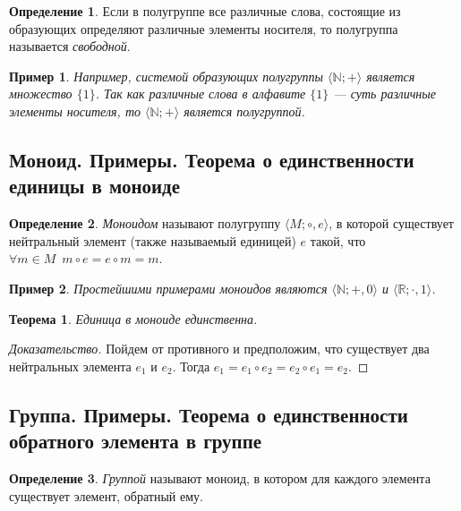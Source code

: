 \documentclass{article}
\newtheorem*{theorem*}{Теорема}
\theoremstyle{plain}
\newtheorem*{example*}{Пример}
\theoremstyle{definition}
\newtheorem{definition}{Определение}[subsection]
\begin{document}
\begin{definition}
	Если в полугруппе все различные слова, состоящие из образующих определяют различные элементы носителя, то полугруппа называется \textit{свободной}.
\end{definition}

\begin{example*}
	Например, системой образующих полугруппы \(\langle \mathbb{N}; + \rangle\) является множество \(\{1\}\). Так как различные слова в алфавите \(\{1\}\) — суть различные элементы носителя, то \(\langle \mathbb{N}; + \rangle\) является полугруппой.
\end{example*}

\subsection{Моноид. Примеры. Теорема о единственности единицы в моноиде}

\begin{definition}
	\textit{Моноидом} называют полугруппу \(\langle M; \circ, e\rangle\), в которой существует нейтральный элемент (также называемый единицей) \(e\) такой, что \(\forall m \in M \enspace m \circ e = e \circ m = m\).
\end{definition}

\begin{example*}
	Простейшими примерами моноидов являются \(\langle \mathbb{N}; +, 0\rangle\) и \(\langle \mathbb{R}; \cdot, 1 \rangle\).
\end{example*}

\begin{theorem*}
	Единица в моноиде единственна.
\end{theorem*}

\begin{proof}[Доказательство]
	Пойдем от противного и предположим, что существует два нейтральных элемента \(e_1\) и \(e_2\). Тогда \(e_1 = e_1 \circ e_2 = e_2 \circ e_1 = e_2\).
\end{proof}

\subsection{Группа. Примеры. Теорема о единственности обратного элемента в группе}

\begin{definition}
	\textit{Группой} называют моноид, в котором для каждого элемента существует элемент, обратный ему.
\end{definition}
\end{document}
